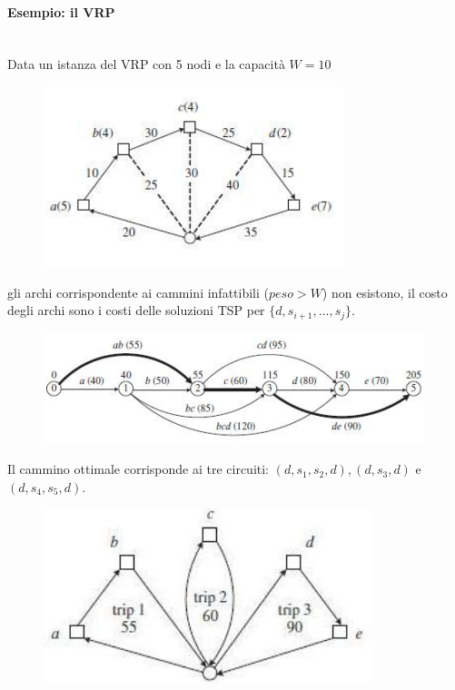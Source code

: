 \documentclass{article}
\begin{document}
\paragraph{Esempio: il VRP}\mbox{}\\
Data un istanza del VRP con 5 nodi e la capacità $W=10$
\begin{figure}[H]
    \centering
    \includegraphics[scale=0.6]{images/VRP_ex1.png}
\end{figure}
gli archi corrispondente ai cammini infattibili ($peso > W$) non esistono, il costo degli archi
sono i costi delle soluzioni TSP per $\{d,s_{i+1},\dots,s_j\}$.
\begin{figure}[H]
    \centering
    \includegraphics[scale=0.6]{images/VRP_ex2.png}
\end{figure}

Il cammino ottimale corrisponde ai tre circuiti: $(d,s_1,s_2,d),(d,s_3,d)$ e $(d,s_4,s_5,d)$.
\begin{figure}[H]
    \centering
    \includegraphics[scale=0.6]{images/VRP_ex3.png}
\end{figure}
\end{document}
